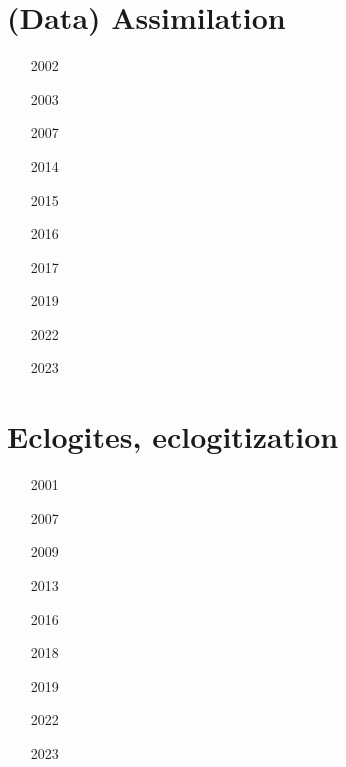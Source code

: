 
\section{(Data) Assimilation}

\begin{small}
\begin{itemize}
\item[2002]
\item[2003]
\item[2007]
\item[2014]
\item[2015]
\item[2016]
\item[2017]
\item[2019]
\item[2022]
\item[2023]
\end{itemize}
\end{small}

\section{Eclogites, eclogitization}

\begin{small}
\begin{itemize}
\item[2001]
\item[2007]
\item[2009]
\item[2013]
\item[2016]
\item[2018]
\item[2019]
\item[2022]
\item[2023]
\item[\twothousandtwentyfour]
\end{itemize}
\end{small}

